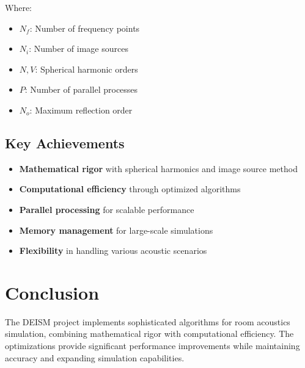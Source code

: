 \documentclass[11pt,a4paper]{article}
\begin{document}
Where:
\begin{itemize}
    \item $N_f$: Number of frequency points
    \item $N_i$: Number of image sources
    \item $N, V$: Spherical harmonic orders
    \item $P$: Number of parallel processes
    \item $N_o$: Maximum reflection order
\end{itemize}

\subsection{Key Achievements}

\begin{itemize}
    \item \textbf{Mathematical rigor} with spherical harmonics and image source method
    \item \textbf{Computational efficiency} through optimized algorithms
    \item \textbf{Parallel processing} for scalable performance
    \item \textbf{Memory management} for large-scale simulations
    \item \textbf{Flexibility} in handling various acoustic scenarios
\end{itemize}

\section{Conclusion}

The DEISM project implements sophisticated algorithms for room acoustics simulation, combining mathematical rigor with computational efficiency. The optimizations provide significant performance improvements while maintaining accuracy and expanding simulation capabilities.
\end{document}

